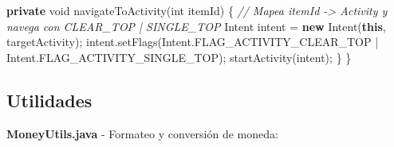 \documentclass[
  spanish,
  11pt,
  paper=a4,
  ,captions=tableheading
]{scrartcl}
\newenvironment{Shaded}{}{}
\newcommand{\CommentTok}[1]{\textcolor[rgb]{0.38,0.63,0.69}{\textit{#1}}}
\newcommand{\DataTypeTok}[1]{\textcolor[rgb]{0.56,0.13,0.00}{#1}}
\newcommand{\FunctionTok}[1]{\textcolor[rgb]{0.02,0.16,0.49}{#1}}
\newcommand{\KeywordTok}[1]{\textcolor[rgb]{0.00,0.44,0.13}{\textbf{#1}}}
\newcommand{\NormalTok}[1]{#1}
\newcommand{\OperatorTok}[1]{\textcolor[rgb]{0.40,0.40,0.40}{#1}}
\begin{document}
\begin{Shaded}
\begin{Highlighting}[]
    \KeywordTok{private} \DataTypeTok{void} \FunctionTok{navigateToActivity}\OperatorTok{(}\DataTypeTok{int}\NormalTok{ itemId}\OperatorTok{)} \OperatorTok{\{}
        \CommentTok{// Mapea itemId {-}\textgreater{} Activity y navega con CLEAR\_TOP | SINGLE\_TOP}
\NormalTok{        Intent intent }\OperatorTok{=} \KeywordTok{new} \FunctionTok{Intent}\OperatorTok{(}\KeywordTok{this}\OperatorTok{,}\NormalTok{ targetActivity}\OperatorTok{);}
\NormalTok{        intent}\OperatorTok{.}\FunctionTok{setFlags}\OperatorTok{(}\NormalTok{Intent}\OperatorTok{.}\FunctionTok{FLAG\_ACTIVITY\_CLEAR\_TOP} \OperatorTok{|}\NormalTok{ Intent}\OperatorTok{.}\FunctionTok{FLAG\_ACTIVITY\_SINGLE\_TOP}\OperatorTok{);}
        \FunctionTok{startActivity}\OperatorTok{(}\NormalTok{intent}\OperatorTok{);}
    \OperatorTok{\}}
\OperatorTok{\}}
\end{Highlighting}
\end{Shaded}

\hypertarget{utilidades}{%
\subsection{Utilidades}\label{utilidades}}

\textbf{MoneyUtils.java} - Formateo y conversión de moneda:
\end{document}
